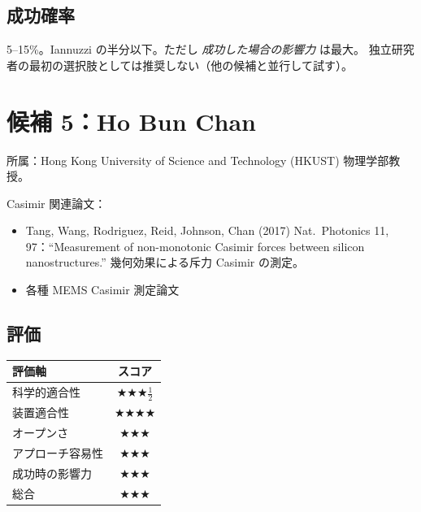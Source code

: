 \documentclass[11pt,a4paper]{article}
\def\textbf#1{#1}%
\begin{document}
\subsection{成功確率}

\textbf{5--15\%}。Iannuzzi の半分以下。ただし \emph{成功した場合の影響力} は最大。
独立研究者の最初の選択肢としては推奨しない（他の候補と並行して試す）。

\newpage

\section{候補 5：Ho Bun Chan}

\begin{candidatebox}
\textbf{所属}：Hong Kong University of Science and Technology (HKUST)
物理学部教授。

\textbf{Casimir 関連論文}：
\begin{itemize}
\item \textbf{Tang, Wang, Rodriguez, Reid, Johnson, Chan (2017) Nat.\ Photonics
  11, 97}：``Measurement of non-monotonic Casimir forces between silicon
  nanostructures.'' \textbf{幾何効果による斥力 Casimir の測定}。
\item 各種 MEMS Casimir 測定論文
\end{itemize}
\end{candidatebox}

\subsection{評価}

\begin{center}
\begin{tabular}{lc}
\toprule
評価軸 & スコア \\
\midrule
科学的適合性    & ★★★$\frac{1}{2}$ \\
装置適合性      & ★★★★ \\
オープンさ      & ★★★ \\
アプローチ容易性 & ★★★ \\
成功時の影響力  & ★★★ \\
\midrule
\textbf{総合}   & \textbf{★★★} \\
\bottomrule
\end{tabular}
\end{center}
\end{document}
